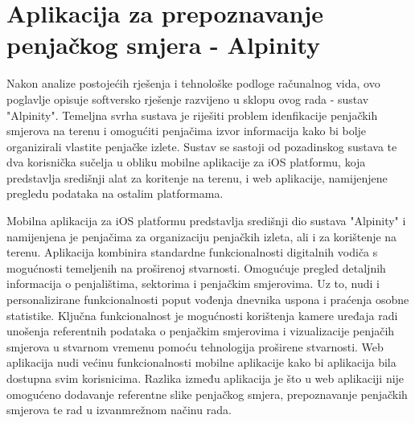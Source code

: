 \chapter{Aplikacija za prepoznavanje penjačkog smjera - Alpinity}

Nakon analize postojećih rješenja i tehnološke podloge računalnog vida, ovo poglavlje opisuje softversko rješenje razvijeno u sklopu ovog rada - sustav "Alpinity". Temeljna svrha sustava je riješiti problem idenfikacije penjačkih smjerova na terenu i omogućiti penjačima izvor informacija kako bi bolje organizirali vlastite penjačke izlete. Sustav se sastoji od pozadinskog sustava te dva korisnička sučelja u obliku mobilne aplikacije za iOS platformu, koja predstavlja središnji alat za koritenje na terenu, i web aplikacije, namijenjene pregledu podataka na ostalim platformama. 

Mobilna aplikacija za iOS platformu predstavlja središnji dio sustava "Alpinity" i namijenjena je penjačima za organizaciju penjačkih izleta, ali i za korištenje na terenu. Aplikacija kombinira standardne funkcionalnosti digitalnih vodiča s mogućnosti temeljenih na proširenoj stvarnosti. Omogućuje pregled detaljnih informacija o penjalištima, sektorima i penjačkim smjerovima. Uz to, nudi i personalizirane funkcionalnosti poput vođenja dnevnika uspona i praćenja osobne statistike. 
Ključna funkcionalnost je mogućnosti korištenja kamere uređaja radi unošenja referentnih podataka o penjačkim smjerovima i vizualizacije penjačih smjerova u stvarnom vremenu pomoću tehnologija proširene stvarnosti. Web aplikacija nudi većinu funkcionalnosti mobilne aplikacije kako bi aplikacija bila dostupna svim korisnicima. Razlika između aplikacija je što u web aplikaciji nije omogućeno dodavanje referentne slike penjačkog smjera, prepoznavanje penjačkih smjerova te rad u izvanmrežnom načinu rada. 











